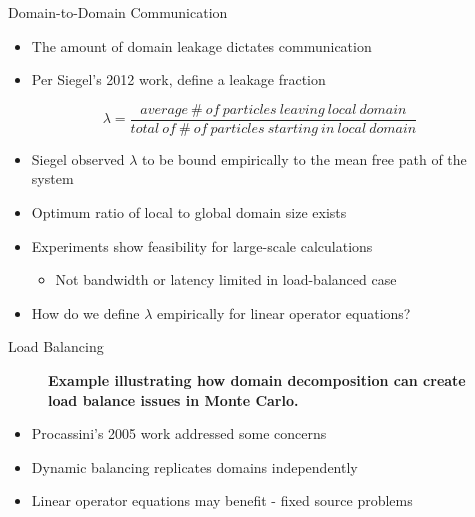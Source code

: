 \documentclass{beamer}
\begin{document}
\begin{frame}{Domain-to-Domain Communication}

  \begin{itemize}
  \item The amount of domain leakage dictates communication
  \item Per Siegel's 2012 work, define a leakage fraction
  \end{itemize}

  \[
  \lambda =
  \frac{average\ \#\ of\ particles\ leaving\ local\ domain}{total\ 
    of\ \#\ of\ particles\ starting\ in\ local\ domain}
  \]

  \begin{itemize}
  \item Siegel observed $\lambda$ to be bound empirically to the mean
    free path of the system
  \item Optimum ratio of local to global domain size exists
  \item Experiments show feasibility for large-scale calculations
    \begin{itemize}
    \item Not bandwidth or latency limited in load-balanced case
    \end{itemize}
    \pause
  \item How do we define $\lambda$ empirically for linear operator
    equations? 
  \end{itemize}

\end{frame}

\begin{frame}{Load Balancing}

  \begin{figure}[htpb!]
    \begin{center}
      \scalebox{1.0}{  }
    \end{center}
    \caption{\textbf{Example illustrating how domain decomposition can
        create load balance issues in Monte Carlo.}}
    \label{fig:procassini_example}
  \end{figure}

  \begin{itemize}
  \item Procassini's 2005 work addressed some concerns
  \item Dynamic balancing replicates domains independently
  \item Linear operator equations may benefit - fixed source problems
  \end{itemize}

\end{frame}
\end{document}
